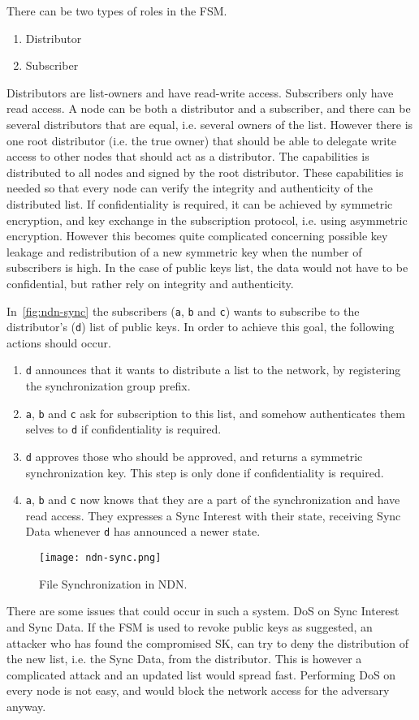 There can be two types of roles in the \gls{FSM}. 
\begin{enumerate}
	\item Distributor
	\item Subscriber
\end{enumerate}
Distributors are list-owners and have read-write access.
Subscribers only have read access.
A node can be both a distributor and a subscriber, and there can be several distributors that are equal, i.e. several owners of the list.
However there is one root distributor (i.e. the true owner) that should be able to delegate write access to other nodes that should act as a distributor. 
The capabilities is distributed to all nodes and signed by the root distributor.
These capabilities is needed so that every node can verify the integrity and authenticity of the distributed list.
If confidentiality is required, it can be achieved by symmetric encryption, and key exchange in the subscription protocol, i.e. using asymmetric encryption.
However this becomes quite complicated concerning possible key leakage and redistribution of a new symmetric key when the number of subscribers is high. 
In the case of public keys list, the data would not have to be confidential, but rather rely on integrity and authenticity.

In~\autoref{fig:ndn-sync} the subscribers (\texttt{a}, \texttt{b} and \texttt{c}) wants to subscribe to the distributor's (\texttt{d}) list of public keys.
In order to achieve this goal, the following actions should occur.
\begin{enumerate}
	\item \texttt{d} announces that it wants to distribute a list to the network, by registering the synchronization group prefix. 
	\item \texttt{a}, \texttt{b} and \texttt{c} ask for subscription to this list, and somehow authenticates them selves to \texttt{d} if confidentiality is required.
	\item \texttt{d} approves those who should be approved, and returns a symmetric synchronization key. 
	This step is only done if confidentiality is required.
	\item \texttt{a}, \texttt{b} and \texttt{c} now knows that they are a part of the synchronization and have read access. They expresses a Sync Interest with their state, receiving Sync Data whenever \texttt{d} has announced a newer state.
\end{enumerate}

\begin{figure}[ht]
  \centering
  \texttt{[image: ndn-sync.png]}
  \caption{File Synchronization in NDN.}
  \label{fig:ndn-sync}
\end{figure}

There are some issues that could occur in such a system. 
\gls{DoS} on Sync Interest and Sync Data. 
If the \gls{FSM} is used to revoke public keys as suggested, an attacker who has found the compromised \gls{SK}, can try to deny the distribution of the new list, i.e. the Sync Data, from the distributor. 
This is however a complicated attack and an updated list would spread fast.
Performing \gls{DoS} on every node is not easy, and would block the network access for the adversary anyway.
